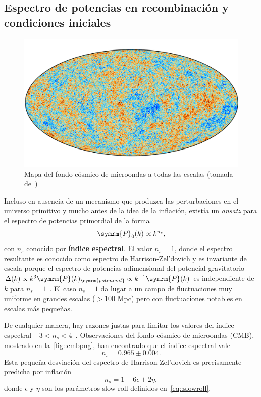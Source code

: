 \subsection{Espectro de potencias en recombinación y condiciones iniciales}\label{sec::espectrolin}
\begin{figure}[t]
    \centering
    \includegraphics[scale=.7]{img/Cmb_inpaint_T_smica_v1-min.png}
    \caption[Mapa del fondo cósmico de microondas]{Mapa del fondo cósmico de microondas a todas las escalas (tomada de~\cite{collaboration2020planck4})}
    \label{fig::cmbpng}
\end{figure}
Incluso en ausencia de un mecanismo que produzca las perturbaciones en el universo primitivo y mucho antes de la idea de la inflación, existía un \textit{ansatz} para el espectro de potencias primordial de la forma~\cite{harrison1970,zel1970hypothesis,peebles1970primeval}
\begin{equation}
    \symrm{P}_0(k)\propto k^{n_s},\label{eq::espectroprim}
\end{equation}
con \(n_s\) conocido por \textbf{índice espectral}. El valor \(n_s=1\), donde el espectro resultante es conocido como espectro de Harrison-Zel'dovich y es invariante de escala porque el espectro de potencias adimensional del potencial gravitatorio \(\Delta(k)\propto k^3\symrm{P}(k)_{\symrm{potencial}}\propto k^{-1}\symrm{P}(k)\) es independiente de \(k\) para \(n_s=1\)~\cite{baumann2022cosmology}. El caso \(n_s=1\) da lugar a un campo de fluctuaciones muy uniforme en grandes escalas (\(>100\) Mpc) pero con fluctuaciones notables en escalas más pequeñas.

De cualquier manera, hay razones justas para limitar los valores del índice espectral \(-3<n_s<4\)~\cite{peacock1998cosmological}. Observaciones del fondo cósmico de microondas (CMB), mostrado en la~\autoref{fig::cmbpng}, han encontrado que el índice espectral vale~\cite{collaboration2020planck}
\begin{equation}
    n_s=0.965\pm 0.004.\label{eq::theoryns}
\end{equation}
Esta pequeña desviación del espectro de Harrison-Zel'dovich es precisamente predicha por inflación
\begin{equation}
    n_s=1-6\epsilon+2\eta,
\end{equation}
donde \(\epsilon\) y \(\eta\) son los parámetros slow-roll definidos en~\eqref{eq::slowroll}.


